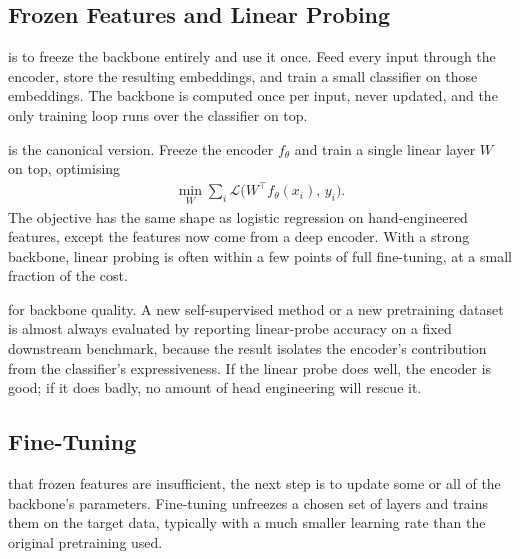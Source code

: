 \subsection{Frozen Features and Linear Probing}

 is to freeze the backbone entirely and use it once. Feed every input through the encoder, store the resulting embeddings, and train a small classifier on those embeddings. The backbone is computed once per input, never updated, and the only training loop runs over the classifier on top.

 is the canonical version. Freeze the encoder $f_\theta$ and train a single linear layer $W$ on top, optimising
\begin{align*}
    \min_{W} \sum_i \mathcal{L}\bigl(W^\top f_\theta(x_i),\, y_i\bigr).
\end{align*}
The objective has the same shape as logistic regression on hand-engineered features, except the features now come from a deep encoder. With a strong backbone, linear probing is often within a few points of full fine-tuning, at a small fraction of the cost.


 for backbone quality. A new self-supervised method or a new pretraining dataset is almost always evaluated by reporting linear-probe accuracy on a fixed downstream benchmark, because the result isolates the encoder's contribution from the classifier's expressiveness. If the linear probe does well, the encoder is good; if it does badly, no amount of head engineering will rescue it.

\subsection{Fine-Tuning}

 that frozen features are insufficient, the next step is to update some or all of the backbone's parameters. Fine-tuning unfreezes a chosen set of layers and trains them on the target data, typically with a much smaller learning rate than the original pretraining used.

